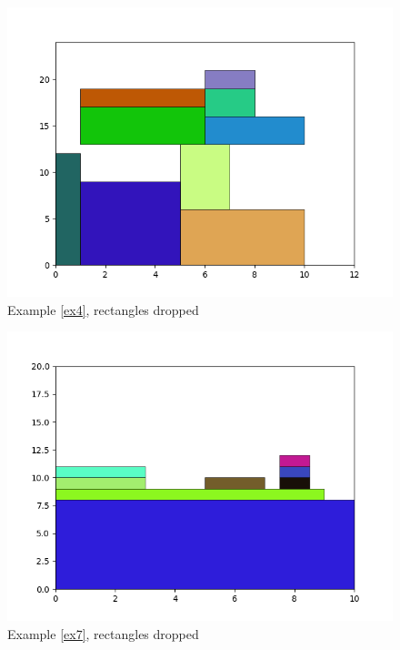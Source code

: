 \documentclass{article}
\theoremstyle{definition}
\theoremstyle{theorem}
\numberwithin{proposition}{section}
\begin{document}
        \begin{figure}[H]
            \centering
            \includegraphics[scale=0.5]{../examples/dropped-4.png}
            \caption{Example \ref{ex4}, rectangles dropped}
        \end{figure}
        \begin{figure}[H]
            \centering
            \includegraphics[scale=0.5]{../examples/dropped-7.png}
            \caption{Example \ref{ex7}, rectangles dropped}
        \end{figure}
\end{document}
